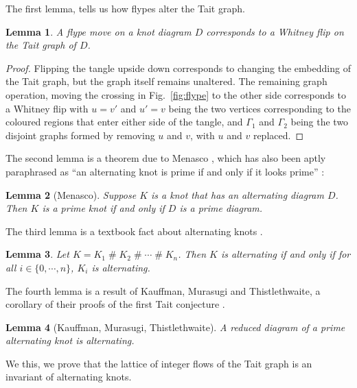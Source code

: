 \documentclass[12pt]{report}
\newcommand{\hash}{\ensuremath{\mathbin{\#}}}
\newtheorem*{lemma}{Lemma}
\theoremstyle{upright}
\begin{document}
The first lemma, tells us how flypes alter the Tait graph.

\begin{lemma}
	A flype move on a knot diagram $D$ corresponds to a Whitney flip on the Tait graph of $D$.
\end{lemma}

\begin{proof}
	Flipping the tangle upside down corresponds to changing the embedding of the Tait graph, but the graph itself remains unaltered. The remaining graph operation, moving the crossing in Fig.~\ref{fig:flype} to the other side corresponds to a Whitney flip with $u = v'$ and $u' = v$ being the two vertices corresponding to the coloured regions that enter either side of the tangle, and $\Gamma_{1}$ and $\Gamma_{2}$ being the two disjoint graphs formed by removing $u$ and $v$, with $u$ and $v$ replaced.
\end{proof}


The second lemma is a theorem due to Menasco \cite{closed-incompressible-surfaces}, which has also been aptly paraphrased as ``an alternating knot is prime if and only if it looks prime'' \cite{the-first-two-million-knots}:

\begin{lemma}[Menasco]
	Suppose $K$ is a knot that has an alternating diagram $D$. Then $K$ is a prime knot if and only if $D$ is a prime diagram.
\end{lemma}

The third lemma is a textbook fact about alternating knots \cite{introduction-knot-theory}.

\begin{lemma}
	Let $K = K_{1} \hash K_{2} \hash \cdots \hash K_{n}$. Then $K$ is alternating if and only if for all $i \in \{0, \cdots, n\}$, $K_{i}$ is alternating.
\end{lemma}

The fourth lemma is a result of Kauffman, Murasugi and Thistlethwaite, a corollary of their proofs of the first Tait conjecture \cite{state-models-jones-polynomial, jones-polynomials-classical-conjectures, spanning-tree-expansion-jones-polynomial}.

\begin{lemma}[Kauffman, Murasugi, Thistlethwaite]
	A reduced diagram of a prime alternating knot is alternating.
\end{lemma}

We this, we prove that the lattice of integer flows of the Tait graph is an invariant of alternating knots.
\end{document}
